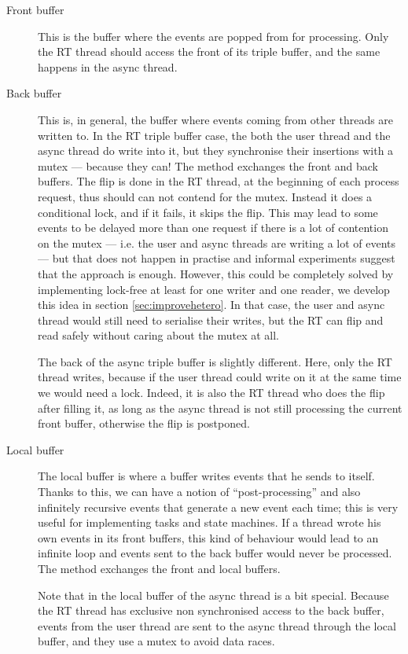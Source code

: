 \begin{description}
\item[Front buffer] This is the buffer where the events are popped
  from for processing. Only the RT thread should access the front
  of its triple buffer, and the same happens in the async thread.

\item[Back buffer] This is, in general, the buffer where events coming
  from other threads are written to. In the RT triple buffer case, the
  both the user thread and the async thread do write into it, but they
  synchronise their insertions with a mutex --- because they can! The
   method exchanges the front and back
  buffers. The flip is done in the RT thread, at the beginning of each
  process request, thus should can not contend for the mutex. Instead
  it does a conditional lock, and if it fails, it skips the flip. This
  may lead to some events to be delayed more than one request if there
  is a lot of contention on the mutex --- i.e. the user and async
  threads are writing a lot of events --- but that does not happen in
  practise and informal experiments suggest that the approach is
  enough. However, this could be completely solved by implementing
   lock-free at least for one writer and one
  reader, we develop this idea in section \ref{sec:improvehetero}. In
  that case, the user and async thread would still need to serialise
  their writes, but the RT can flip and read safely without caring
  about the mutex at all.

  The back of the async triple buffer is slightly different. Here,
  only the RT thread writes, because if the user thread could write on
  it at the same time we would need a lock. Indeed, it is also the RT
  thread who does the flip after filling it, as long as the async
  thread is not still processing the current front buffer, otherwise
  the flip is postponed.

\item[Local buffer] The local buffer is where a buffer writes events
  that he sends to itself. Thanks to this, we can have a notion of
  ``post-processing'' and also infinitely recursive events that
  generate a new event each time; this is very useful for implementing
  tasks and state machines. If a thread wrote his own events in its
  front buffers, this kind of behaviour would lead to an infinite loop
  and events sent to the back buffer would never be processed. The
   method exchanges the front and local buffers.

  Note that in the local buffer of the async thread is a bit
  special. Because the RT thread has exclusive non synchronised access
  to the back buffer, events from the user thread are sent to the
  async thread through the local buffer, and they use a mutex to avoid
  data races.
\end{description}

